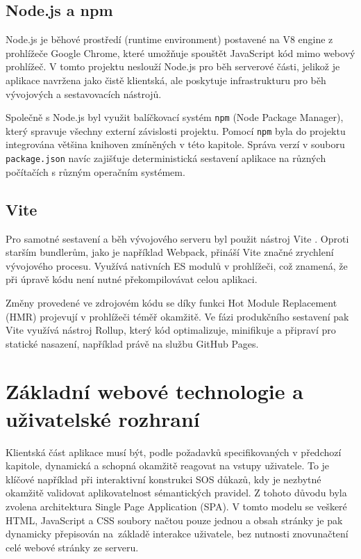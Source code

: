 \subsection{Node.js a npm}
Node.js \cite{nodejs_2025_nodejs} je běhové prostředí (runtime environment) postavené na V8 engine z prohlížeče Google Chrome, které umožňuje spouštět JavaScript kód mimo webový prohlížeč. 
V tomto projektu neslouží Node.js pro běh serverové části, jelikož je aplikace navržena jako čistě klientská, ale poskytuje infrastrukturu pro běh vývojových a sestavovacích nástrojů. 

Společně s Node.js byl využit balíčkovací systém \texttt{npm} (Node Package Manager), který spravuje všechny externí závislosti projektu. 
Pomocí \texttt{npm} byla do projektu integrována většina knihoven zmíněných v této kapitole. 
Správa verzí v souboru \texttt{package.json} navíc zajišťuje deterministická sestavení aplikace na různých počítačích s různým operačním systémem.

\subsection{Vite}
Pro samotné sestavení a běh vývojového serveru byl použit nástroj Vite \cite{vite_2024_vite}. 
Oproti starším bundlerům, jako je například Webpack, přináší Vite značné zrychlení vývojového procesu. 
Využívá nativních ES modulů v prohlížeči, což znamená, že při úpravě kódu není nutné překompilovávat celou aplikaci. 

Změny provedené ve zdrojovém kódu se díky funkci Hot Module Replacement (HMR) projevují v prohlížeči téměř okamžitě.
Ve fázi produkčního sestavení pak Vite využívá nástroj Rollup, který kód optimalizuje, minifikuje a připraví pro statické nasazení, například právě na službu GitHub Pages.

\section{Základní webové technologie a uživatelské rozhraní}
Klientská část aplikace musí být, podle požadavků specifikovaných v předchozí kapitole, dynamická a schopná okamžitě reagovat na vstupy uživatele. 
To je klíčové například při interaktivní konstrukci SOS důkazů, kdy je nezbytné okamžitě validovat aplikovatelnost sémantických pravidel. 
Z tohoto důvodu byla zvolena architektura Single Page Application (SPA). 
V tomto modelu se veškeré HTML, JavaScript a CSS soubory načtou pouze jednou a obsah stránky je pak dynamicky přepisován na~základě interakce uživatele, bez nutnosti znovunačtení celé webové stránky ze serveru.

